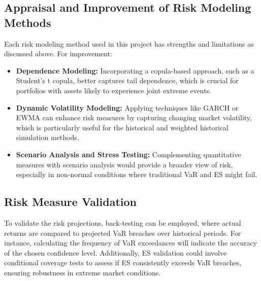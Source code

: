 \subsection{Appraisal and Improvement of Risk Modeling Methods}
Each risk modeling method used in this project has strengths and limitations as discussed above. For improvement:
\begin{itemize}
    \item \textbf{Dependence Modeling:} Incorporating a copula-based approach, such as a Student’s t copula, better captures tail dependence, which is crucial for portfolios with assets likely to experience joint extreme events.
    \item \textbf{Dynamic Volatility Modeling:} Applying techniques like GARCH or EWMA can enhance risk measures by capturing changing market volatility, which is particularly useful for the historical and weighted historical simulation methods.
    \item \textbf{Scenario Analysis and Stress Testing:} Complementing quantitative measures with scenario analysis would provide a broader view of risk, especially in non-normal conditions where traditional VaR and ES might fail.
\end{itemize}
\subsection{Risk Measure Validation}
To validate the risk projections, back-testing can be employed, where actual returns are compared to projected VaR breaches over historical periods. For instance, calculating the frequency of VaR exceedances will indicate the accuracy of the chosen confidence level. Additionally, ES validation could involve conditional coverage tests to assess if ES consistently exceeds VaR breaches, ensuring robustness in extreme market conditions.